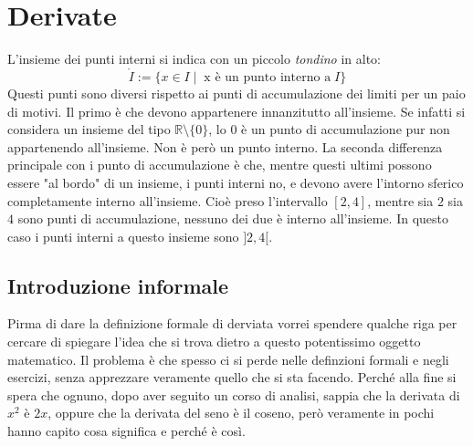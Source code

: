 \section{Derivate}



L'insieme dei punti interni si indica con un piccolo \textit{tondino} in alto:
\begin{equation*}
	\mathring{I} := \{x \in I \; | \;\; \text{x è un punto interno a}\;I\} 
\end{equation*}
Questi punti sono diversi rispetto ai punti di accumulazione dei limiti per un paio di motivi. Il primo è che devono appartenere innanzitutto all'insieme. Se infatti si considera un insieme del tipo $\mathbb{R} \setminus \{0\}$, lo $0$ è un punto di accumulazione pur non appartenendo all'insieme. Non è però un punto interno. La seconda differenza principale con i punto di accumulazione è che, mentre questi ultimi possono essere "al bordo" di un insieme, i punti interni no, e devono avere l'intorno sferico completamente interno all'insieme. Cioè preso l'intervallo $[2, 4]$, mentre sia $2$ sia $4$ sono punti di accumulazione, nessuno dei due è interno all'insieme. In questo caso i punti interni a questo insieme sono $]2,4[$.

\subsection{Introduzione informale}
Pirma di dare la definizione formale di derviata vorrei spendere qualche riga per cercare di spiegare l'idea che si trova dietro a questo potentissimo oggetto matematico. Il problema è che spesso ci si perde nelle definzioni formali e negli esercizi, senza apprezzare veramente quello che si sta facendo. Perché alla fine si spera che ognuno, dopo aver seguito un corso di analisi, sappia che la derivata di $x^2$ è $2x$, oppure che la derivata del seno è il coseno, però veramente in pochi hanno capito cosa significa e perché è così.\\

